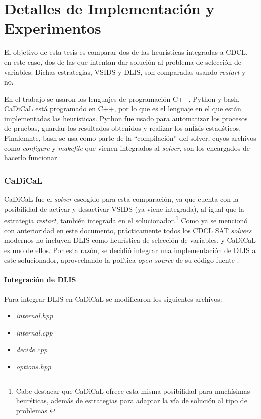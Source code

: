 \chapter{Detalles de Implementación y Experimentos}
\label{chapter:implementation}
El objetivo de esta tesis es comparar dos de las heuristicas integradas a CDCL, en este caso, dos de las que intentan dar soluci\'on al problema de selecci\'on de variables: Dichas estrategias, VSIDS y DLIS, son comparadas usando \textit{restart} y no.

En el trabajo se usaron los lenguajes de programaci\'on C++, Python y bash. CaDiCaL est\'a programado en C++, por lo que es el lenguaje en el que est\'an implementadas las heur\'isticas. Python fue usado para automatizar los procesos de pruebas, guardar los resultados obtenidos y realizar los an\'lisis estad\'sticos. Finalemnte, bash se usa como parte de la ``compilaci\'on'' del solver, cuyos archivos como \textit{configure} y \textit{makefile} que vienen integrados al \textit{solver}, son los encargados de hacerlo funcionar.

\subsection{CaDiCaL}
CaDiCaL fue el \textit{solver} escogido para esta comparaci\'on, ya que cuenta con la posibilidad de activar y desactivar VSIDS (ya viene integrada), al igual que la estrategia \textit{restart}, tambi\'en integrada en el solucionador.\footnote{Cabe destacar que CaDiCaL ofrece esta misma posibilidad para much\'isimas heur\'sticas, adem\'as de estrategias para adaptar la v\'ia de soluci\'on al tipo de problemas \cite{cadical2024}} Como ya se mencion\'o con anterioridad en este documento, pr\'acticamente todos los CDCL SAT \textit{solvers} modernos no incluyen DLIS como heur\'istica de selecci\'on de variables, y CaDiCaL es uno de ellos. Por esta raz\'on, se decidi\'o integrar una implementaci\'on de DLIS a este solucionador, aprovechando la pol\'itica \textit{open source} de su c\'odigo fuente \cite{cadical2024}.%

\subsubsection{Integraci\'on de DLIS}
Para integrar DLIS en CaDiCaL se modificaron los siguientes archivos:
\begin{itemize}
    \item \textit{internal.hpp}
    \item \textit{internal.cpp}
    \item \textit{decide.cpp}
    \item \textit{options.hpp}
\end{itemize}

